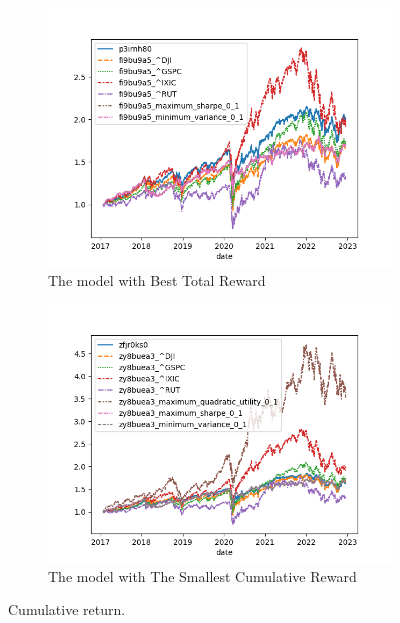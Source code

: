 \documentclass[../xlapes02]{subfiles}
\begin{document}
    \begin{figure}[h!]
        \centering
        \begin{subfigure}[b]{\experimentimgwidth\textwidth}
            \centering
            \includegraphics[width=\linewidth]{image/figure/returns_max}
            \caption{The model with Best Total Reward}
            \label{fig:returns_max}
        \end{subfigure}
        \hfill
        \begin{subfigure}{\experimentimgwidth\textwidth}
            \centering
            \includegraphics[width=\linewidth]{image/figure/returns_min}
            \caption{The model with The Smallest Cumulative Reward}
            \label{fig:returns_min}
        \end{subfigure}
        \caption{Cumulative return.}
        \label{fig:Cumulative Return}
    \end{figure}
\end{document}
